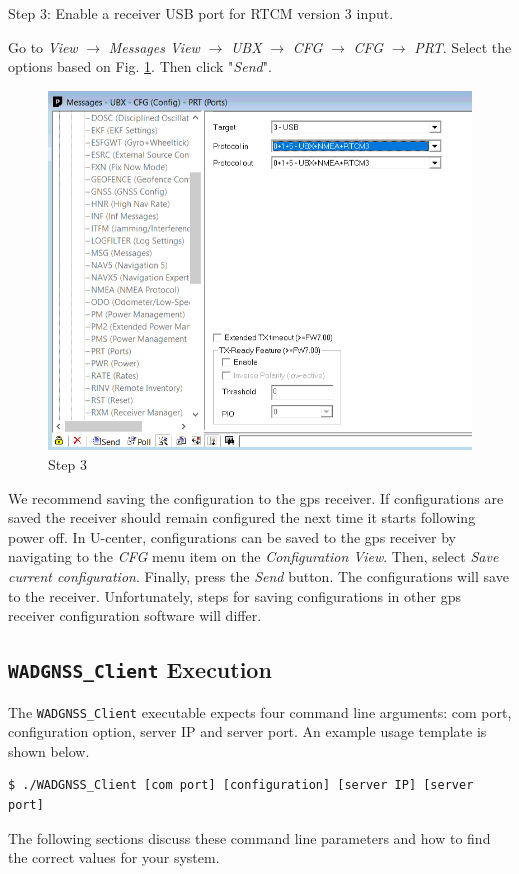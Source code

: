 Step 3: Enable a receiver USB port for RTCM version 3 input. 


Go to \emph{View} $\rightarrow$ \emph{Messages View} $\rightarrow$ \emph{UBX} $\rightarrow$ \emph{CFG} $\rightarrow$ \emph{CFG} $\rightarrow$ \emph{PRT}. Select the options based on Fig. \ref{fig:usb}. Then click "\emph{Send}". 
\begin{figure}[H]
	\centering
	\includegraphics[scale=0.4]{./graphics/usb}
	\caption{Step 3 \label{fig:usb}}
\end{figure}

We recommend saving the configuration to the gps receiver. If configurations are saved the receiver should remain configured the next time it starts following power off. In U-center, configurations can be saved to the gps receiver by navigating to the \emph{CFG}  menu item on the \emph{Configuration View}. Then, select \emph{Save current configuration}. Finally, press the \emph{Send} button. The configurations will save to the receiver. Unfortunately, steps for saving configurations in other gps receiver configuration software will differ. 

\subsection{\texttt{WADGNSS\_Client} Execution}
The \texttt{WADGNSS\_Client} executable expects four command line arguments: com port, configuration option, server IP and server port. An example usage template is shown below. 
\begin{verbatim}
$ ./WADGNSS_Client [com port] [configuration] [server IP] [server port]
\end{verbatim}
The following sections discuss these command line parameters and how to find the correct values for your system. 

